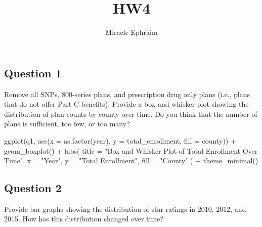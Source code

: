 \documentclass[
]{article}
\title{HW4}
\author{Miracle Ephraim}
\date{}
\newenvironment{Shaded}{\begin{snugshade}}{\end{snugshade}}
\newcommand{\AttributeTok}[1]{\textcolor[rgb]{0.40,0.45,0.13}{#1}}
\newcommand{\FunctionTok}[1]{\textcolor[rgb]{0.28,0.35,0.67}{#1}}
\newcommand{\NormalTok}[1]{\textcolor[rgb]{0.00,0.23,0.31}{#1}}
\newcommand{\SpecialCharTok}[1]{\textcolor[rgb]{0.37,0.37,0.37}{#1}}
\newcommand{\StringTok}[1]{\textcolor[rgb]{0.13,0.47,0.30}{#1}}
\begin{document}
\maketitle


\subsection{Question 1}\label{question-1}

Remove all SNPs, 800-series plans, and prescription drug only plans
(i.e., plans that do not offer Part C benefits). Provide a box and
whisker plot showing the distribution of plan counts by county over
time. Do you think that the number of plans is sufficient, too few, or
too many?

\begin{Shaded}
\begin{Highlighting}[]
\FunctionTok{ggplot}\NormalTok{(q1, }\FunctionTok{aes}\NormalTok{(}\AttributeTok{x =} \FunctionTok{as.factor}\NormalTok{(year), }\AttributeTok{y =}\NormalTok{ total\_enrollment, }\AttributeTok{fill =}\NormalTok{ county)) }\SpecialCharTok{+}
    \FunctionTok{geom\_boxplot}\NormalTok{() }\SpecialCharTok{+}
    \FunctionTok{labs}\NormalTok{(}
        \AttributeTok{title =} \StringTok{"Box and Whisker Plot of Total Enrollment Over Time"}\NormalTok{,}
        \AttributeTok{x =} \StringTok{"Year"}\NormalTok{,}
        \AttributeTok{y =} \StringTok{"Total Enrollment"}\NormalTok{,}
        \AttributeTok{fill =} \StringTok{"County"}
\NormalTok{    ) }\SpecialCharTok{+}
    \FunctionTok{theme\_minimal}\NormalTok{()}
\end{Highlighting}
\end{Shaded}

\subsection{Question 2}\label{question-2}

Provide bar graphs showing the distribution of star ratings in 2010,
2012, and 2015. How has this distribution changed over time?
\end{document}
